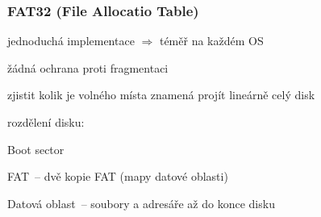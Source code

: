 \subsubsection*{FAT32 (File Allocatio Table)}
\begin{pitemize}
  \item jednoduchá implementace $\Rightarrow$ téměř na každém OS
  \item žádná ochrana proti fragmentaci
  \item zjistit kolik je volného místa znamená projít lineárně celý disk
  \item rozdělení disku:
  \begin{pitemize}
    \item Boot sector
    \item FAT~-- dvě kopie FAT (mapy datové oblasti)
    \item Datová oblast~-- soubory a adresáře až do konce disku
  \end{pitemize}
\end{pitemize}
